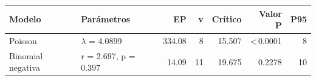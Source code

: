 \begin{tabular}{llrrrrr}
\toprule
\textbf{Modelo} & \textbf{Parámetros} & \textbf{EP} & \textbf{v} & \textbf{Crítico} & \textbf{Valor P} & \textbf{P95} \\ \midrule
Poisson & $\lambda$ = 4.0899 & 334.08 & 8 & 15.507 & <\,0.0001 & 8 \\
Binomial negativa & r = 2.697, p = 0.397 & 14.09 & 11 & 19.675 & 0.2278 & 10 \\
\bottomrule
\end{tabular}